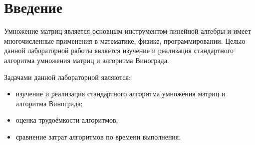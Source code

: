 \chapter*{Введение}

Умножение матриц является основным инструментом линейной алгебры и имеет многочисленные применения в математике, физике, программировании. Целью данной лабораторной работы является изучение и реализация стандартного алгоритма умножения матриц и алгоритма Винограда.

Задачами данной лабораторной являются:

\begin{itemize}
	\item изучение и реализация стандартного алгоритма умножения матриц и алгоритма Винограда;
	\item оценка трудоёмкости алгоритмов;
	\item сравнение затрат алгоритмов по времени выполнения.
\end{itemize}
